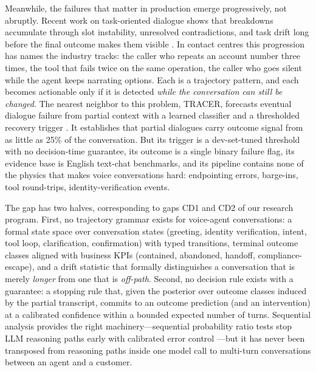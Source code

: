 Meanwhile, the failures that matter in production emerge progressively, not abruptly.
Recent work on task-oriented dialogue shows that breakdowns accumulate through
slot instability, unresolved contradictions, and task drift long before the final
outcome makes them visible \citep{nourbakhsh2026tracer}.
In contact centres this progression has names the industry tracks: the caller who repeats
an account number three times, the tool that fails twice on the same operation,
the caller who goes silent while the agent keeps narrating options.
Each is a trajectory pattern, and each becomes actionable only if it is detected
\emph{while the conversation can still be changed}.
The nearest neighbor to this problem, TRACER, forecasts eventual dialogue failure from
partial context with a learned classifier and a thresholded recovery trigger \citep{nourbakhsh2026tracer}.
It establishes that partial dialogues carry outcome signal from as little as 25\% of the
conversation.
But its trigger is a dev-set-tuned threshold with no decision-time guarantee,
its outcome is a single binary failure flag,
its evidence base is English text-chat benchmarks,
and its pipeline contains none of the physics that makes voice conversations hard:
endpointing errors, barge-ins, tool round-trips, identity-verification events.

The gap has two halves, corresponding to gaps CD1 and CD2 of our research program.
First, no trajectory grammar exists for voice-agent conversations:
a formal state space over conversation states (greeting, identity verification, intent, tool loop,
clarification, confirmation) with typed transitions,
terminal outcome classes aligned with business KPIs
(contained, abandoned, handoff, compliance-escape),
and a drift statistic that formally distinguishes a conversation that is merely
\emph{longer} from one that is \emph{off-path}.
Second, no decision rule exists with a guarantee:
a stopping rule that, given the posterior over outcome classes induced by the partial
transcript, commits to an outcome prediction (and an intervention) at a calibrated
confidence within a bounded expected number of turns.
Sequential analysis provides the right machinery---sequential probability ratio
tests stop LLM reasoning paths early with calibrated error control \citep{consol2025}---but
it has never been transposed from reasoning paths inside one model call
to multi-turn conversations between an agent and a customer.

